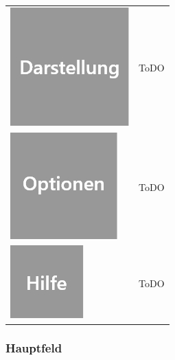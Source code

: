 \documentclass[parskip=full]{scrartcl}
\begin{document}
\begin{tabular}[t]{p{1cm} p{10cm}}
	\vspace{0cm}\includegraphics[width = 1 cm]{Grafik/Darstellung.jpg} & ToDO\\
	\vspace{0cm}\includegraphics[width = 1 cm]{Grafik/Optionen.jpg} & ToDO\\
	\vspace{0cm}\includegraphics[width = 1 cm]{Grafik/Hilfe.jpg} & ToDO\\
\end{tabular}

\subsubsection{Hauptfeld}
\end{document}
